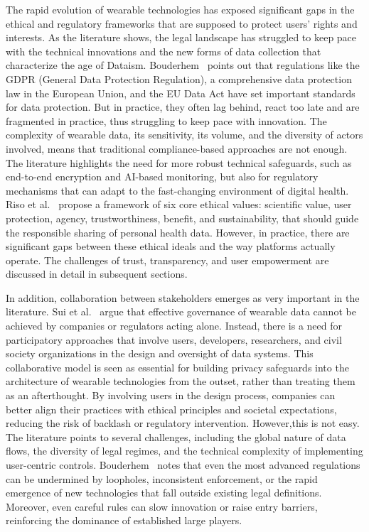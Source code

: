 	The rapid evolution of wearable technologies has exposed significant gaps in the ethical and regulatory frameworks that are supposed to protect users’ rights and interests. As the literature shows, the legal landscape has struggled to keep pace with the technical innovations and the new forms of data collection that characterize the age of Dataism. Bouderhem~\cite{Bouderhem2023} points out that regulations like the GDPR (General Data Protection Regulation), a comprehensive data protection law in the European Union, and the EU Data Act have set important standards for data protection. But in practice, they often lag behind, react too late and are fragmented in practice, thus struggling to keep pace with innovation. The complexity of wearable data, its sensitivity, its volume, and the diversity of actors involved, means that traditional compliance-based approaches are not enough. The literature highlights the need for more robust technical safeguards, such as end-to-end encryption and AI-based monitoring, but also for regulatory mechanisms that can adapt to the fast-changing environment of digital health. Riso et al.~\cite{Riso2017} propose a framework of six core ethical values: scientific value, user protection, agency, trustworthiness, benefit, and sustainability, that should guide the responsible sharing of personal health data. However, in practice, there are significant gaps between these ethical ideals and the way platforms actually operate. The challenges of trust, transparency, and user empowerment are discussed in detail in subsequent sections.

	In addition, collaboration between stakeholders emerges as very important in the literature. Sui et al.~\cite{Sui2023} argue that effective governance of wearable data cannot be achieved by companies or regulators acting alone. Instead, there is a need for participatory approaches that involve users, developers, researchers, and civil society organizations in the design and oversight of data systems. This collaborative model is seen as essential for building privacy safeguards into the architecture of wearable technologies from the outset, rather than treating them as an afterthought. By involving users in the design process, companies can better align their practices with ethical principles and societal expectations, reducing the risk of backlash or regulatory intervention. However,this is not easy. The literature points to several challenges, including the global nature of data flows, the diversity of legal regimes, and the technical complexity of implementing user-centric controls. Bouderhem~\cite{Bouderhem2023} notes that even the most advanced regulations can be undermined by loopholes, inconsistent enforcement, or the rapid emergence of new technologies that fall outside existing legal definitions. Moreover, even careful rules can slow innovation or raise entry barriers, reinforcing the dominance of established large players.

